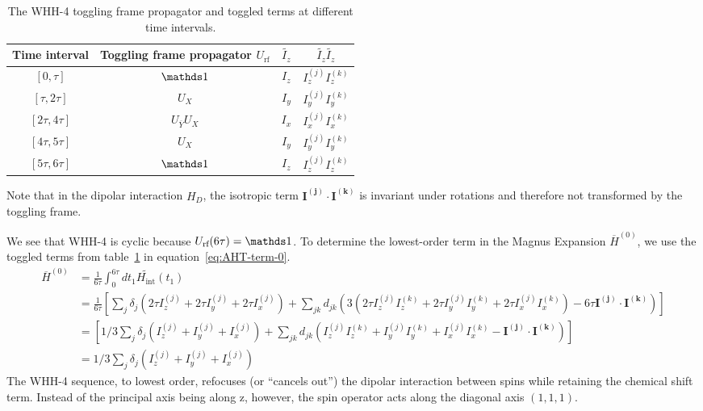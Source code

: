 \begin{table}[H]
    \centering
    \caption{The WHH-4 toggling frame propagator and toggled terms at different time intervals.}
    \label{tab:WHH-4}
    \begin{tabular}{c c c c}
        Time interval & Toggling frame propagator $U_{\text{rf}}$ & $\widetilde{I_z}$ & $\widetilde{I_z}\widetilde{I_z}$ \\
        \hline
        $[0, \tau]$ & $\identity$ & $I_z$ & $I_z^{(j)}I_z^{(k)}$ \\
        $[\tau, 2\tau]$ & $U_X$ & $I_y$ & $I_y^{(j)}I_y^{(k)}$ \\
        $[2\tau, 4\tau]$ & $U_{\overline{Y}} U_X$ & $I_x$ & $I_x^{(j)}I_x^{(k)}$ \\
        $[4\tau, 5\tau]$ & $U_X$ & $I_y$ & $I_y^{(j)}I_y^{(k)}$ \\
        $[5\tau, 6\tau]$ & $\identity$ & $I_z$ & $I_z^{(j)}I_z^{(k)}$ \\
    \end{tabular}
\end{table}

Note that in the dipolar interaction $H_D$, the isotropic term $\mathbf{I^{(j)}} \cdot \mathbf{I^{(k)}}$ is invariant under rotations and therefore not transformed by the toggling frame.

We see that WHH-4 is cyclic because $U_{\text{rf}}(6\tau) = \identity$. To determine the lowest-order term in the Magnus Expansion $\overline{H}^{(0)}$, we use the toggled terms from table~\ref{tab:WHH-4} in equation~\ref{eq:AHT-term-0}.
\begin{align*}
    \overline{H}^{(0)} &= \frac{1}{6\tau} \int_0^{6\tau} dt_1
    \widetilde{H_{\text{int}}}(t_1) \\
    &= \frac{1}{6\tau} \left[
        \sum_j \delta_j \left(2\tau I_z^{(j)} + 2\tau I_y^{(j)} + 2\tau I_x^{(j)} \right) +
        \sum_{jk} d_{jk} \left(3(
            2\tau I_z^{(j)}I_z^{(k)} + 2\tau I_y^{(j)}I_y^{(k)} + 2\tau I_x^{(j)}I_x^{(k)}
        ) - 6\tau \mathbf{I^{(j)}} \cdot \mathbf{I^{(k)}} \right)
    \right] \\
    &= \left[
        1/3 \sum_j \delta_j \left(I_z^{(j)} + I_y^{(j)} + I_x^{(j)} \right) +
        \sum_{jk} d_{jk} \left(I_z^{(j)}I_z^{(k)} + I_y^{(j)}I_y^{(k)} + I_x^{(j)}I_x^{(k)} - \mathbf{I^{(j)}} \cdot \mathbf{I^{(k)}} \right)
    \right] \\
    &= 1/3 \sum_j \delta_j \left(I_z^{(j)} + I_y^{(j)} + I_x^{(j)} \right)
\end{align*}
The WHH-4 sequence, to lowest order, refocuses (or ``cancels out'') the dipolar interaction between spins while retaining the chemical shift term. Instead of the principal axis being along z, however, the spin operator acts along the diagonal axis $(1,1,1)$.

